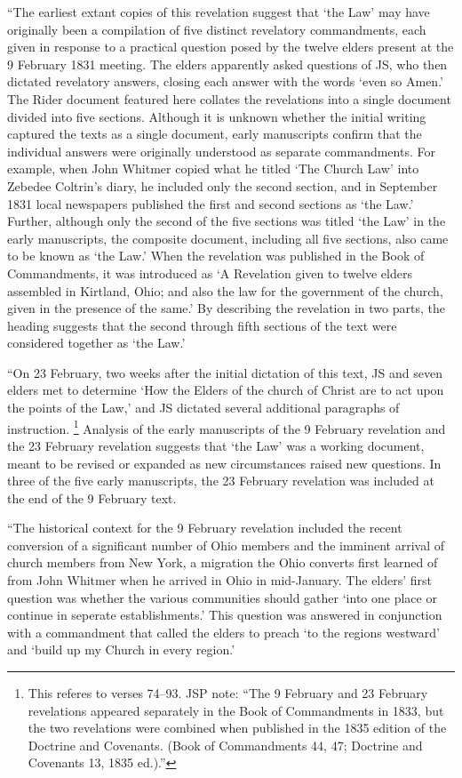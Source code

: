 				``The earliest extant copies of this revelation suggest that `the Law' may have originally been a compilation of five distinct revelatory commandments, each given in response to a practical question posed by the twelve elders present at the 9 February 1831 meeting. The elders apparently asked questions of JS, who then dictated revelatory answers, closing each answer with the words `even so Amen.' The Rider document featured here collates the revelations into a single document divided into five sections. Although it is unknown whether the initial writing captured the texts as a single document, early manuscripts confirm that the individual answers were originally understood as separate commandments. For example, when John Whitmer copied what he titled `The Church Law' into Zebedee Coltrin's diary, he included only the second section, and in September 1831 local newspapers published the first and second sections as `the Law.' Further, although only the second of the five sections was titled `the Law' in the early manuscripts, the composite document, including all five sections, also came to be known as `the Law.' When the revelation was published in the Book of Commandments, it was introduced as `A Revelation given to twelve elders assembled in Kirtland, Ohio; and also the law for the government of the church, given in the presence of the same.' By describing the revelation in two parts, the heading suggests that the second through fifth sections of the text were considered together as `the Law.'

				``On 23 February, two weeks after the initial dictation of this text, JS and seven elders met to determine `How the Elders of the church of Christ are to act upon the points of the Law,' and JS dictated several additional paragraphs of instruction.%
					\footnote{%
						This referes to verses 74--93. JSP note: ``The 9 February and 23 February revelations appeared separately in the Book of Commandments in 1833, but the two revelations were combined when published in the 1835 edition of the Doctrine and Covenants. (Book of Commandments 44, 47; Doctrine and Covenants 13, 1835 ed.).''
						}
				Analysis of the early manuscripts of the 9 February revelation and the 23 February revelation suggests that `the Law' was a working document, meant to be revised or expanded as new circumstances raised new questions. In three of the five early manuscripts, the 23 February revelation was included at the end of the 9 February text.

				``The historical context for the 9 February revelation included the recent conversion of a significant number of Ohio members and the imminent arrival of church members from New York, a migration the Ohio converts first learned of from John Whitmer when he arrived in Ohio in mid-January. The elders' first question was whether the various communities should gather `into one place or continue in seperate establishments.' This question was answered in conjunction with a commandment that called the elders to preach `to the regions westward' and `build up my Church in every region.'

